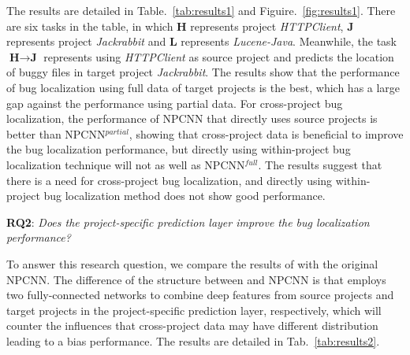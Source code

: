 The results are detailed in Table.~\ref{tab:results1} and Figuire.~\ref{fig:results1}. There are six tasks in the table, in which $\textbf{H}$ represents project \textit{HTTPClient}, $\textbf{J}$ represents project \textit{Jackrabbit} and $\textbf{L}$ represents \textit{Lucene-Java}. Meanwhile, the task $\textbf{H} \rightarrow \textbf{J}$ represents using \textit{HTTPClient} as source project and predicts the location of buggy files in target project \textit{Jackrabbit}. The results show that the performance of bug localization using full data of target projects is the best, which has a large gap against the performance using partial data. For cross-project bug localization, the performance of NPCNN that directly uses source projects is better than NPCNN$^{partial}$, showing that cross-project data is beneficial to improve the bug localization performance, but directly using within-project bug localization technique will not as well as NPCNN$^{full}$. The results suggest that there is a need for cross-project bug localization, and directly using within-project bug localization method does not show good performance.

\textbf{RQ2}: \textit{Does the project-specific prediction layer improve the bug localization performance?}

To answer this research question, we compare the results of \TRANPCNN with the original NPCNN. The difference of the structure between \TRANPCNN and NPCNN is that \TRANPCNN employs two fully-connected networks to combine deep features from source projects and target projects in the project-specific prediction layer, respectively, which will counter the influences that cross-project data may have different distribution leading to a bias performance. The results are detailed in Tab.~\ref{tab:results2}.


